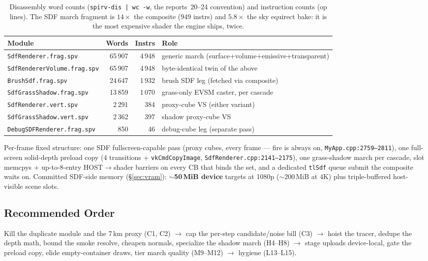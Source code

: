 \documentclass[11pt,a4paper]{article}
\begin{document}
\begin{table}[h]
\centering
\small
\begin{tabular}{@{}lrrl@{}}
\toprule
\textbf{Module} & \textbf{Words} & \textbf{Instrs} & \textbf{Role} \\
\midrule
\texttt{SdfRenderer.frag.spv} & 65\,907 & 4\,948 & generic march (surface+volume+emissive+transparent) \\
\texttt{SdfRendererVolume.frag.spv} & 65\,907 & 4\,948 & byte-identical twin of the above \\
\texttt{BrushSdf.frag.spv} & 24\,647 & 1\,932 & brush SDF leg (fetched via composite) \\
\texttt{SdfGrassShadow.frag.spv} & 13\,859 & 1\,070 & grass-only EVSM caster, per cascade \\
\texttt{SdfRenderer.vert.spv} & 2\,291 & 384 & proxy-cube VS (either variant) \\
\texttt{SdfGrassShadow.vert.spv} & 2\,362 & 397 & shadow proxy-cube VS \\
\texttt{DebugSDFRenderer.frag.spv} & 850 & 46 & debug-cube leg (separate pass) \\
\bottomrule
\end{tabular}
\caption{Disassembly word counts (\texttt{spirv-dis | wc -w}, the
reports~20--24 convention) and instruction counts (op lines). The SDF march
fragment is $14\times$ the composite (949 instrs) and $5.8\times$ the sky
equirect bake: it is the most expensive shader the engine ships, twice.}
\end{table}

Per-frame fixed structure: one SDF fullscreen-capable pass (proxy cubes,
every frame --- fire is always on, \texttt{MyApp.cpp:2759--2811}), one
full-screen solid-depth preload copy (4 transitions + \texttt{vkCmdCopyImage},
\texttt{SdfRenderer.cpp:2141--2175}), one grass-shadow march per cascade,
slot memcpys + up-to-8-entry HOST$\rightarrow$shader barriers on every CB
that binds the set, and a dedicated \texttt{tlSdf} queue submit the composite
waits on. Committed SDF-side memory (\S\ref{sec:vram}):
\textbf{$\sim$50\,MiB device} targets at 1080p ($\sim$200\,MiB at 4K) plus
triple-buffered host-visible scene slots.

\subsection{Recommended Order}

Kill the duplicate module and the 7\,km proxy (C1, C2) $\rightarrow$ cap the
per-step candidate/noise bill (C3) $\rightarrow$ hoist the tracer, dedupe the
depth math, bound the smoke resolve, cheapen normals, specialize the shadow
march (H4--H8) $\rightarrow$ stage uploads device-local, gate the preload
copy, elide empty-container draws, tier march quality (M9--M12)
$\rightarrow$ hygiene (L13--L15).
\end{document}

